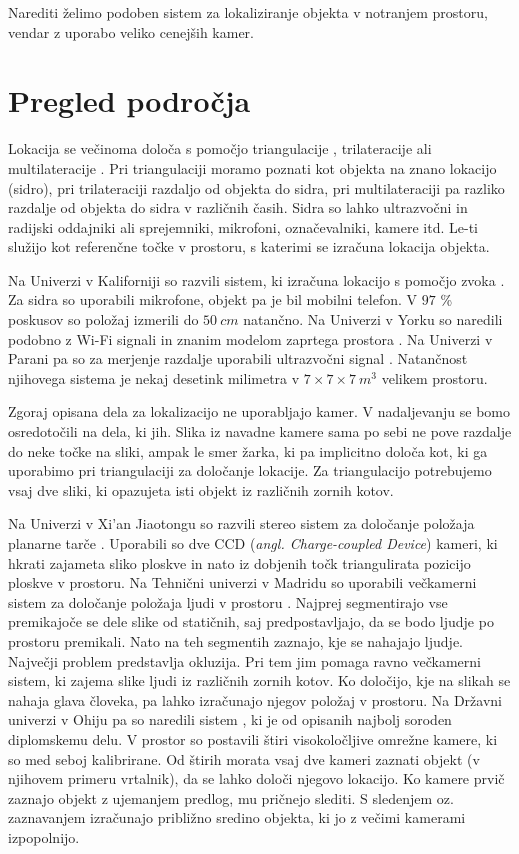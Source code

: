 \documentclass[a4paper, 12pt]{book}
\begin{document}
Narediti želimo podoben sistem za lokaliziranje objekta v notranjem prostoru, vendar z uporabo veliko cenejših kamer.

\section{Pregled področja}
Lokacija se večinoma določa s pomočjo triangulacije \cite{wiki:triangulation}, trilateracije \cite{wiki:trilateration} ali multilateracije \cite{wiki:multilateration}. Pri triangulaciji moramo poznati kot objekta na znano lokacijo (sidro), pri trilateraciji razdaljo od objekta do sidra, pri multilateraciji pa razliko razdalje od objekta do sidra v različnih časih. Sidra so lahko ultrazvočni in radijski oddajniki ali sprejemniki, mikrofoni, označevalniki, kamere itd. Le-ti služijo kot referenčne točke v prostoru, s katerimi se izračuna lokacija objekta.

Na Univerzi v Kaliforniji so razvili sistem, ki izračuna lokacijo s pomočjo zvoka \cite{mandal2005beep}. Za sidra so uporabili mikrofone, objekt pa je bil mobilni telefon. V $97$ \% poskusov so položaj izmerili do $50 \ cm$ natančno. Na Univerzi v Yorku so naredili podobno z Wi-Fi signali in znanim modelom zaprtega prostora \cite{chan2013dynamic}. Na Univerzi v Parani pa so za merjenje razdalje uporabili ultrazvočni signal \cite{auer20033d}. Natančnost njihovega sistema je nekaj desetink milimetra v $7\times7\times7 \ m^3$ velikem prostoru.

Zgoraj opisana dela za lokalizacijo ne uporabljajo kamer. V nadaljevanju se bomo osredotočili na dela, ki jih. Slika iz navadne kamere sama po sebi ne pove razdalje do neke točke na sliki, ampak le smer žarka, ki pa implicitno določa kot, ki ga uporabimo pri triangulaciji za določanje lokacije. Za triangulacijo potrebujemo vsaj dve sliki, ki opazujeta isti objekt iz različnih zornih kotov.

Na Univerzi v Xi’an Jiaotongu so razvili stereo sistem za določanje položaja planarne tarče \cite{li2008development}. Uporabili so dve CCD (\emph{angl. Charge-coupled Device}) \cite{wiki:ccd} kameri, ki hkrati zajameta sliko ploskve in nato iz dobjenih točk triangulirata pozicijo ploskve v prostoru. Na Tehnični univerzi v Madridu so uporabili večkamerni sistem za določanje položaja ljudi v prostoru \cite{mohedano2008robust}. Najprej segmentirajo vse premikajoče se dele slike od statičnih, saj predpostavljajo, da se bodo ljudje po prostoru premikali. Nato na teh segmentih zaznajo, kje se nahajajo ljudje. Največji problem predstavlja okluzija. Pri tem jim pomaga ravno večkamerni sistem, ki zajema slike ljudi iz različnih zornih kotov. Ko določijo, kje na slikah se nahaja glava človeka, pa lahko izračunajo njegov položaj v prostoru. Na Državni univerzi v Ohiju pa so naredili sistem \cite{lee2013real}, ki je od opisanih najbolj soroden diplomskemu delu. V prostor so postavili štiri visokoločljive omrežne kamere, ki so med seboj kalibrirane. Od štirih morata vsaj dve kameri zaznati objekt (v njihovem primeru vrtalnik), da se lahko določi njegovo lokacijo. Ko kamere prvič zaznajo objekt z ujemanjem predlog, mu pričnejo slediti. S sledenjem oz. zaznavanjem izračunajo približno sredino objekta, ki jo z večimi kamerami izpopolnijo.
\end{document}
